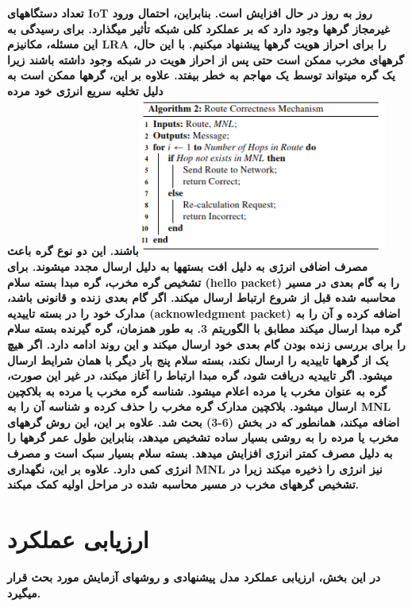 \documentclass{article} %
\begin{document}
\noindent 
{\bf تعداد دستگاههای IoT روز به روز در حال افزایش است. بنابراین، احتمال ورود غیرمجاز گرهها وجود دارد که بر عملکرد کلی شبکه تأثیر میگذارد. برای رسیدگی به این مسئله، مکانیزم LRA را برای احراز هویت گرهها پیشنهاد میکنیم. با این حال، گرههای مخرب ممکن است حتی پس از احراز هویت در شبکه وجود داشته باشند زیرا یک گره میتواند توسط یک مهاجم به خطر بیفتد. علاوه بر این، گرهها ممکن است به دلیل تخلیه سریع انرژی خود مرده \includegraphics*[width=3.23in, height=2.05in]{image11}باشند. این دو نوع گره باعث مصرف اضافی انرژی به دلیل افت بستهها به دلیل ارسال مجدد میشوند. برای تشخیص گره مخرب، گره مبدا بسته سلام (hello packet) را به گام بعدی در مسیر محاسبه شده قبل از شروع ارتباط ارسال میکند. اگر گام بعدی زنده و قانونی باشد، مدارک خود را در بسته تاییدیه (acknowledgment packet) اضافه کرده و آن را به گره مبدا ارسال میکند مطابق با الگوریتم 3. به طور همزمان، گره گیرنده بسته سلام را برای بررسی زنده بودن گام بعدی خود ارسال میکند و این روند ادامه دارد. اگر هیچ یک از گرهها تاییدیه را ارسال نکند، بسته سلام پنج بار دیگر با همان شرایط ارسال میشود. اگر تاییدیه دریافت شود، گره مبدا ارتباط را آغاز میکند، در غیر این صورت، گره به عنوان مخرب یا مرده اعلام میشود. شناسه گره مخرب یا مرده به بلاکچین ارسال میشود. بلاکچین مدارک گره مخرب را حذف کرده و شناسه آن را به MNL اضافه میکند، همانطور که در بخش (6-3) بحث شد. علاوه بر این، این روش گرههای مخرب یا مرده را به روشی بسیار ساده تشخیص میدهد، بنابراین طول عمر گرهها را به دلیل مصرف کمتر انرژی افزایش میدهد. بسته سلام بسیار سبک است و مصرف انرژی کمی دارد. علاوه بر این، نگهداری MNL نیز انرژی را ذخیره میکند زیرا در تشخیص گرههای مخرب در مسیر محاسبه شده در مراحل اولیه کمک میکند.}

\noindent 
{\bf  }


\section{ ارزیابی عملکرد }

\noindent 
{\bf در این بخش، ارزیابی عملکرد مدل پیشنهادی و روشهای آزمایش مورد بحث قرار میگیرد.}

\noindent 
\end{document}
